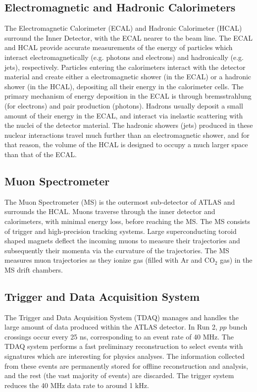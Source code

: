 \subsection{Electromagnetic and Hadronic Calorimeters}
The Electromagnetic Calorimeter (ECAL) and Hadronic Calorimeter (HCAL) surround the Inner Detector, with the ECAL nearer to the beam line. The ECAL and HCAL provide accurate measurements of the energy of particles which interact electromagnetically (e.g. photons and electrons) and hadronically (e.g. jets), respectively. Particles entering the calorimeters interact with the detector material and create either a electromagnetic shower (in the ECAL) or a hadronic shower (in the HCAL), depositing all their energy in the calorimeter cells. The primary mechanism of energy deposition in the ECAL is through bremsstrahlung (for electrons) and pair production (photons). Hadrons usually deposit a small amount of their energy in the ECAL, and interact via inelastic scattering with the nuclei of the detector material. The hadronic showers (jets) produced in these nuclear interactions travel much further than an electromagnetic shower, and for that reason, the volume of the HCAL is designed to occupy a much larger space than that of the ECAL.

\subsection{Muon Spectrometer}
The Muon Spectrometer (MS) is the outermost sub-detector of ATLAS and surrounds the HCAL. Muons traverse through the inner detector and calorimeters, with minimal energy loss, before reaching the MS. The MS consists of trigger and high-precision tracking systems. Large superconducting toroid shaped magnets deflect the incoming muons to measure their trajectories and subsequently their momenta via the curvature of the trajectories. The MS measures muon trajectories as they ionize gas (filled with Ar and CO$_{2}$ gas) in the MS drift chambers.

\subsection{Trigger and Data Acquisition System}
The Trigger and Data Acquisition System (TDAQ) manages and handles the large amount of data produced within the ATLAS detector. In Run 2, $pp$ bunch crossings occur every 25 ns, corresponding to an event rate of 40 MHz. The TDAQ system performs a fast preliminary reconstruction to select events with signatures which are interesting for physics analyses. The information collected from these events are permanently stored for offline reconstruction and analysis, and the rest (the vast majority of events) are discarded. The trigger system reduces the 40 MHz data rate to around 1 kHz.


